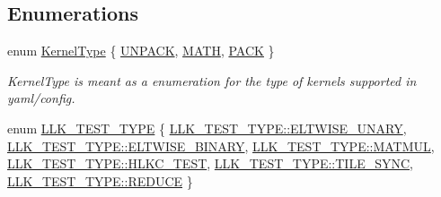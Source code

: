 \subsection*{Enumerations}
\begin{DoxyCompactItemize}
\item 
enum \hyperlink{namespacetests_a4f360b8af533762256ff97513bfd6a0d}{Kernel\+Type} \{ \hyperlink{namespacetests_a4f360b8af533762256ff97513bfd6a0daba3bbf795bfdbe156772d8f44833a3af}{U\+N\+P\+A\+CK}, 
\hyperlink{namespacetests_a4f360b8af533762256ff97513bfd6a0da7b849aa2899a63a2da359bf9a0b5b0af}{M\+A\+TH}, 
\hyperlink{namespacetests_a4f360b8af533762256ff97513bfd6a0daa484d944b59301977fbe221d69d58857}{P\+A\+CK}
 \}\begin{DoxyCompactList}\small\item\em Kernel\+Type is meant as a enumeration for the type of kernels supported in yaml/config. \end{DoxyCompactList}
\item 
enum \hyperlink{namespacetests_a25585fda9706046718066368a7a86897}{L\+L\+K\+\_\+\+T\+E\+S\+T\+\_\+\+T\+Y\+PE} \{ \newline
\hyperlink{namespacetests_a25585fda9706046718066368a7a86897ad8b74e5ec44711dc9d0e0be246c10759}{L\+L\+K\+\_\+\+T\+E\+S\+T\+\_\+\+T\+Y\+P\+E\+::\+E\+L\+T\+W\+I\+S\+E\+\_\+\+U\+N\+A\+RY}, 
\hyperlink{namespacetests_a25585fda9706046718066368a7a86897a632fe7c79c1b93fd7fd5bd8741fc93fe}{L\+L\+K\+\_\+\+T\+E\+S\+T\+\_\+\+T\+Y\+P\+E\+::\+E\+L\+T\+W\+I\+S\+E\+\_\+\+B\+I\+N\+A\+RY}, 
\hyperlink{namespacetests_a25585fda9706046718066368a7a86897a96e0c01268a6364b4cffa5baf7c87809}{L\+L\+K\+\_\+\+T\+E\+S\+T\+\_\+\+T\+Y\+P\+E\+::\+M\+A\+T\+M\+UL}, 
\hyperlink{namespacetests_a25585fda9706046718066368a7a86897aa89d620dbb84ebfe70f7ad1a11c90f07}{L\+L\+K\+\_\+\+T\+E\+S\+T\+\_\+\+T\+Y\+P\+E\+::\+H\+L\+K\+C\+\_\+\+T\+E\+ST}, 
\newline
\hyperlink{namespacetests_a25585fda9706046718066368a7a86897a06a25fc876d955218f56b0f1f999cbac}{L\+L\+K\+\_\+\+T\+E\+S\+T\+\_\+\+T\+Y\+P\+E\+::\+T\+I\+L\+E\+\_\+\+S\+Y\+NC}, 
\hyperlink{namespacetests_a25585fda9706046718066368a7a86897ac26e83d7610e4a0a9307a7bea9aec3d9}{L\+L\+K\+\_\+\+T\+E\+S\+T\+\_\+\+T\+Y\+P\+E\+::\+R\+E\+D\+U\+CE}
 \}
\end{DoxyCompactItemize}
